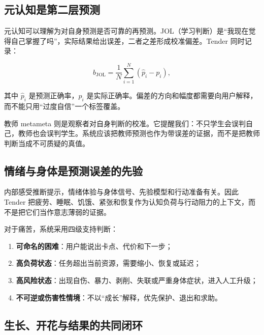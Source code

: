 \documentclass[UTF8,a4paper,11pt]{ctexart}
\begin{document}
\subsection{元认知是第二层预测}

元认知可以理解为对自身预测是否可靠的再预测。JOL（学习判断）是“我现在觉得自己掌握了吗”，实际结果给出误差，二者之差形成校准偏差。Tender 同时记录：

\begin{equation}
b_{\mathrm{JOL}}=\frac{1}{N}\sum_{i=1}^{N}(\hat p_i-p_i),
\end{equation}

其中 \(\hat p_i\) 是预测正确率，\(p_i\) 是实际正确率。偏差的方向和幅度都需要向用户解释，而不能只用“过度自信”一个标签覆盖。

教师 metameta 则是观察者对自身判断的校准。它提醒我们：不只学生会误判自己，教师也会误判学生。系统应该把教师预测也作为带误差的证据，而不是把教师判断当成不可质疑的真值。

\subsection{情绪与身体是预测误差的先验}

内部感受推断提示，情绪体验与身体信号、先验模型和行动准备有关\cite{Seth2013}。因此 Tender 把疲劳、睡眠、饥饿、紧张和恢复作为认知负荷与行动阻力的上下文，而不是把它们当作意志薄弱的证据。

对于痛苦，系统采用四级支持判断：

\begin{enumerate}
\item \textbf{可命名的困难}：用户能说出卡点、代价和下一步；
\item \textbf{高负荷状态}：任务超出当前资源，需要缩小、恢复或延迟；
\item \textbf{高风险状态}：出现自伤、暴力、剥削、失联或严重身体症状，进入人工升级；
\item \textbf{不可逆或伤害性情境}：不以“成长”解释，优先保护、退出和求助。
\end{enumerate}

\subsection{生长、开花与结果的共同闭环}
\end{document}

